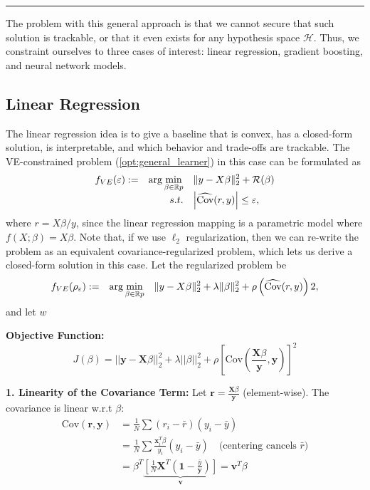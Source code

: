 \documentclass[11pt]{article}
\theoremstyle{plain}
\theoremstyle{definition}
\newcommand{\R}{\mathbb{R}}
\newcommand{\1}{\mathbf{1}}
\renewcommand{\H}{\mathcal{H}}
\renewcommand{\R}{\mathbb{R}}
\begin{document}
\hrule

\newpage

{ The problem with this general approach is that we cannot secure that such solution is trackable, or that it even exists  for any hypothesis space $\H$}. Thus, we constraint ourselves to three cases of interest: linear regression, gradient boosting, and neural network models. 

\subsection{Linear Regression}
The linear regression idea is to give a baseline that is  convex, has a closed-form solution, is interpretable, and which behavior and trade-offs are trackable. The VE-constrained problem (\ref{opt:general_learner}) in this case can be formulated as 
\begin{align}
    {\everymath{\displaystyle}
    \begin{array}{crl}
    f_{VE}(\varepsilon):= &  \arg\min_{\beta \in \R p}  &  \|y - X\beta\|_2^2 + \mathcal{R}(\beta)\\
       & s.t. & \left|\widehat{\text{Cov}}(r, y)\right| \leq \varepsilon ,
    \end{array}
    }
    \label{opt:linear_general_learner}
\end{align}
where $r=X\beta / y$, since the linear regression mapping is a parametric model where $f(X;\beta)=X\beta$. Note that, if we use $\ell_2$ regularization, then we can re-write the problem as an equivalent covariance-regularized problem, which lets us derive a closed-form solution in this case. Let the regularized problem be 
\begin{align}
    {\everymath{\displaystyle}
    \begin{array}{crl}
    f_{VE}(\rho_\varepsilon):= &  \arg\min_{\beta \in \R p}  &  \|y - X\beta\|_2^2 + \lambda \|\beta\|_2^2 +\rho  \left(\widehat{\text{Cov}}(r, y)\right)2,
    \end{array}
    }
    \label{opt:linear_general_learner_penalized}
\end{align}%
and let $w$

\textbf{Objective Function:}
$$ J(\beta) = ||\mathbf{y} - \mathbf{X}\beta||_2^2 + \lambda ||\beta||_2^2 + \rho \left[ \text{Cov}\left(\frac{\mathbf{X}\beta}{\mathbf{y}}, \mathbf{y}\right) \right]^2 $$

\textbf{1. Linearity of the Covariance Term:}
Let $\mathbf{r} = \frac{\mathbf{X}\beta}{\mathbf{y}}$ (element-wise). The covariance is linear w.r.t $\beta$:
\begin{align*}
    \text{Cov}(\mathbf{r}, \mathbf{y}) &= \frac{1}{N} \sum (r_i - \bar{r})(y_i - \bar{y}) \\
    &= \frac{1}{N} \sum \frac{\mathbf{x}_i^T \beta}{y_i} (y_i - \bar{y}) \quad \text{(centering cancels } \bar{r} \text{)} \\
    &= \beta^T \underbrace{\left[ \frac{1}{N} \mathbf{X}^T \left( \mathbf{1} - \frac{\bar{y}}{\mathbf{y}} \right) \right]}_{\mathbf{v}} = \mathbf{v}^T \beta
\end{align*}
\end{document}
